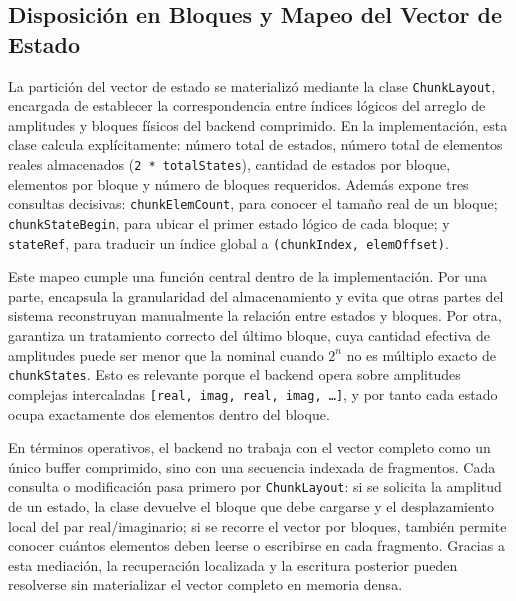 \subsection{Disposición en Bloques y Mapeo del Vector de Estado}

La partición del vector de estado se materializó mediante la clase
\texttt{ChunkLayout}, encargada de establecer la correspondencia entre índices lógicos
del arreglo de amplitudes y bloques físicos del backend comprimido. En la
implementación, esta clase calcula explícitamente: número total de estados,
número total de elementos reales almacenados (\texttt{2 * totalStates}), cantidad de
estados por bloque, elementos por bloque y número de bloques requeridos. Además
expone tres consultas decisivas: \texttt{chunkElemCount}, para conocer el tamaño real de
un bloque; \texttt{chunkStateBegin}, para ubicar el primer estado lógico de cada bloque; y
\texttt{stateRef}, para traducir un índice global a \texttt{(chunkIndex, elemOffset)}.

Este mapeo cumple una función central dentro de la implementación. Por una parte,
encapsula la granularidad del almacenamiento y evita que otras partes del sistema
reconstruyan manualmente la relación entre estados y bloques. Por otra, garantiza un
tratamiento correcto del último bloque, cuya cantidad efectiva de amplitudes puede ser
menor que la nominal cuando $2^n$ no es múltiplo exacto de \texttt{chunkStates}. Esto es
relevante porque el backend opera sobre amplitudes complejas intercaladas
\texttt{[real, imag, real, imag, \ldots]}, y por tanto cada estado ocupa exactamente dos
elementos dentro del bloque.

En términos operativos, el backend no trabaja con el vector completo como un único
buffer comprimido, sino con una secuencia indexada de fragmentos. Cada consulta o
modificación pasa primero por \texttt{ChunkLayout}: si se solicita la amplitud de un estado,
la clase devuelve el bloque que debe cargarse y el desplazamiento local del par
real/imaginario; si se recorre el vector por bloques, también permite conocer cuántos
elementos deben leerse o escribirse en cada fragmento. Gracias a esta mediación, la
recuperación localizada y la escritura posterior pueden resolverse sin materializar el
vector completo en memoria densa.
